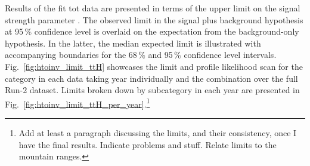 Results of the fit tot data are presented in terms of the upper limit on the signal strength parameter \BRHinvFull. The observed limit in the signal plus background hypothesis at 95\,\% confidence level is overlaid on the expectation from the background-only hypothesis. In the latter, the median expected limit is illustrated with accompanying boundaries for the 68\,\% and 95\,\% confidence level intervals. Fig.~\ref{fig:htoinv_limit_ttH} showcases the limit and profile likelihood scan for the \ttH category in each data taking year individually and the combination over the full Run-2 dataset. Limits broken down by subcategory in each year are presented in Fig.~\ref{fig:htoinv_limit_ttH_per_year}.\footnote{Add at least a paragraph discussing the limits, and their consistency, once I have the final results. Indicate problems and stuff. Relate limits to the mountain ranges.}

